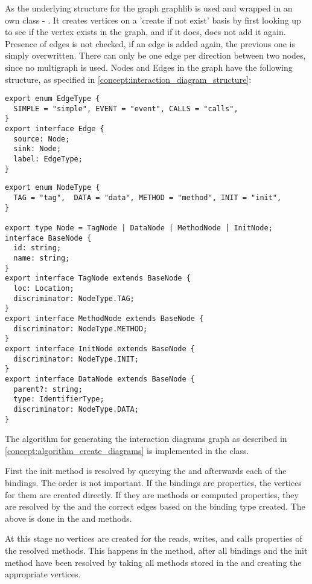 As the underlying structure for the graph graphlib is used and wrapped in an own class - . It creates vertices on a 'create if not exist' basis by first looking up to see if the vertex exists in the graph, and if it does, does not add it again. Presence of edges is not checked, if an edge is added again, the previous one is simply overwritten. There can only be one edge per direction between two nodes, since no multigraph is used. Nodes and Edges in the graph have the following structure, as specified in \ref{concept:interaction_diagram_structure}:

\begin{lstlisting}
export enum EdgeType {
  SIMPLE = "simple", EVENT = "event", CALLS = "calls",
}
export interface Edge {
  source: Node;
  sink: Node;
  label: EdgeType;
}
\end{lstlisting}
\begin{lstlisting}
export enum NodeType {
  TAG = "tag",  DATA = "data", METHOD = "method", INIT = "init",
}

export type Node = TagNode | DataNode | MethodNode | InitNode;
interface BaseNode {
  id: string;
  name: string;
}
export interface TagNode extends BaseNode {
  loc: Location;
  discriminator: NodeType.TAG;
}
export interface MethodNode extends BaseNode {
  discriminator: NodeType.METHOD;
}
export interface InitNode extends BaseNode {
  discriminator: NodeType.INIT;
}
export interface DataNode extends BaseNode {
  parent?: string;
  type: IdentifierType;
  discriminator: NodeType.DATA;
}
\end{lstlisting}


The algorithm for generating the interaction diagrams graph as described in \ref{concept:algorithm_create_diagrams}
is implemented in the  class.

First the init method is resolved by querying the  and afterwards each of the bindings. The order is not important. If the bindings are properties, the vertices for them are created directly. If they are methods or computed properties, they are resolved by the  and the correct edges based on the binding type created. The above is done in the  and  methods.

At this stage no vertices are created for the reads, writes, and calls properties of the resolved methods. 
This happens in the  method, after all bindings and the init method have been resolved by taking all methods stored in the  and creating the appropriate vertices.

